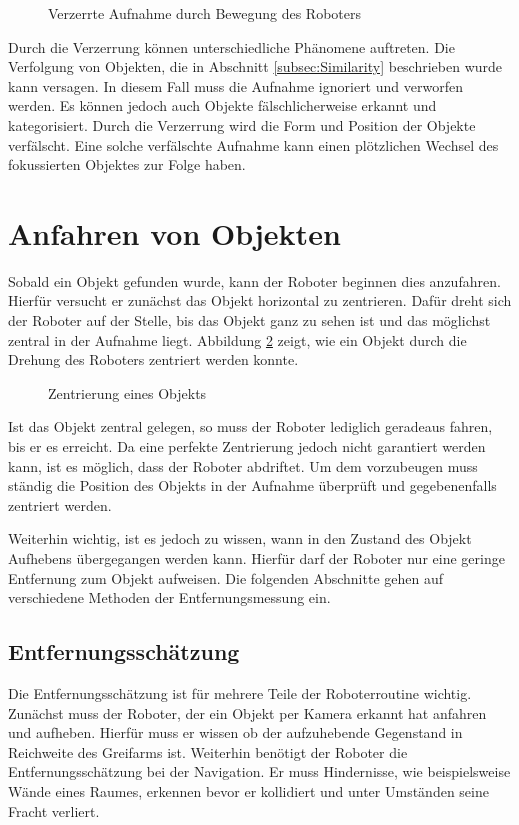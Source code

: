 \begin{figure}[h]
\centering
\caption{Verzerrte Aufnahme durch Bewegung des Roboters}
\label{fig:Verzerrung}
\end{figure}

Durch die Verzerrung können unterschiedliche Phänomene auftreten. Die Verfolgung von Objekten, die in Abschnitt \ref{subsec:Similarity} beschrieben wurde kann versagen. In diesem Fall muss die Aufnahme ignoriert und verworfen werden. Es können jedoch auch Objekte fälschlicherweise erkannt und kategorisiert. Durch die Verzerrung wird die Form und Position der Objekte verfälscht. Eine solche verfälschte Aufnahme kann einen plötzlichen Wechsel des fokussierten Objektes zur Folge haben.

\section{Anfahren von Objekten}
\label{sec:Ansteuerung}

Sobald ein Objekt gefunden wurde, kann der Roboter beginnen dies anzufahren. Hierfür versucht er zunächst das Objekt horizontal zu zentrieren. Dafür dreht sich der Roboter auf der Stelle, bis das Objekt ganz zu sehen ist und das möglichst zentral in der Aufnahme liegt. Abbildung \ref{fig:Zentrierung} zeigt, wie ein Objekt durch die Drehung des Roboters zentriert werden konnte.

\begin{figure}[h]
\centering
\caption{Zentrierung eines Objekts}
\label{fig:Zentrierung}
\end{figure}

Ist das Objekt zentral gelegen, so muss der Roboter lediglich geradeaus fahren, bis er es erreicht. Da eine perfekte Zentrierung jedoch nicht garantiert werden kann, ist es möglich, dass der Roboter abdriftet. Um dem vorzubeugen muss ständig die Position des Objekts in der Aufnahme überprüft und gegebenenfalls zentriert werden.

Weiterhin wichtig, ist es jedoch zu wissen, wann in den Zustand des Objekt Aufhebens übergegangen werden kann. Hierfür darf der Roboter nur eine geringe Entfernung zum Objekt aufweisen. Die folgenden Abschnitte gehen auf verschiedene Methoden der Entfernungsmessung ein.

\subsection{Entfernungsschätzung}
Die Entfernungsschätzung ist für mehrere Teile der Roboterroutine wichtig. Zunächst muss der Roboter, der ein Objekt per Kamera erkannt hat anfahren und aufheben. Hierfür muss er wissen ob der aufzuhebende Gegenstand in Reichweite des Greifarms ist. Weiterhin benötigt der Roboter die Entfernungsschätzung bei der Navigation. Er muss Hindernisse, wie beispielsweise Wände eines Raumes, erkennen bevor er kollidiert und unter Umständen seine Fracht verliert.


